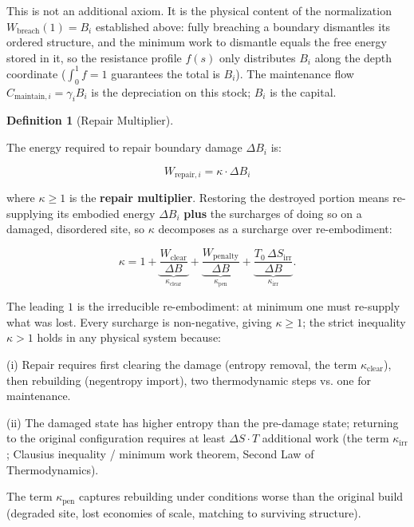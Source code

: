 \documentclass[11pt]{article}
\theoremstyle{plain}
\theoremstyle{definition}
\newtheorem{definition}{Definition}
\theoremstyle{remark}
\begin{document}
This is not an additional axiom. It is the physical content of the
normalization \(W_{\text{breach}}(1) = B_i\) established above: fully
breaching a boundary dismantles its ordered structure, and the minimum
work to dismantle equals the free energy stored in it, so the resistance
profile \(f(s)\) only distributes \(B_i\) along the depth coordinate
(\(\int_0^1 f = 1\) guarantees the total is \(B_i\)). The maintenance
flow \(C_{\text{maintain},i} = \gamma_i B_i\) is the depreciation on
this stock; \(B_i\) is the capital.

\begin{definition}[Repair Multiplier]
\label{def-repair-multiplier}

The energy required to repair boundary damage $\Delta B_i$ is:

$$W_{\text{repair},i} = \kappa \cdot \Delta B_i$$

where $\kappa \geq 1$ is the \textbf{repair multiplier}. Restoring the destroyed portion means re-supplying its embodied energy $\Delta B_i$ \textbf{plus} the surcharges of doing so on a damaged, disordered site, so $\kappa$ decomposes as a surcharge over re-embodiment:

$$\kappa = 1 + \underbrace{\frac{W_{\text{clear}}}{\Delta B}}_{\kappa_{\text{clear}}} + \underbrace{\frac{W_{\text{penalty}}}{\Delta B}}_{\kappa_{\text{pen}}} + \underbrace{\frac{T_0 \, \Delta S_{\text{irr}}}{\Delta B}}_{\kappa_{\text{irr}}}.$$

The leading $1$ is the irreducible re-embodiment: at minimum one must re-supply what was lost. Every surcharge is non-negative, giving $\kappa \geq 1$; the strict inequality $\kappa > 1$ holds in any physical system because:

(i) Repair requires first clearing the damage (entropy removal, the term $\kappa_{\text{clear}}$), then rebuilding (negentropy import), two thermodynamic steps vs. one for maintenance.

(ii) The damaged state has higher entropy than the pre-damage state; returning to the original configuration requires at least $\Delta S \cdot T$ additional work (the term $\kappa_{\text{irr}}$; Clausius inequality / minimum work theorem, Second Law of Thermodynamics).

The term $\kappa_{\text{pen}}$ captures rebuilding under conditions worse than the original build (degraded site, lost economies of scale, matching to surviving structure).
\end{definition}
\end{document}

